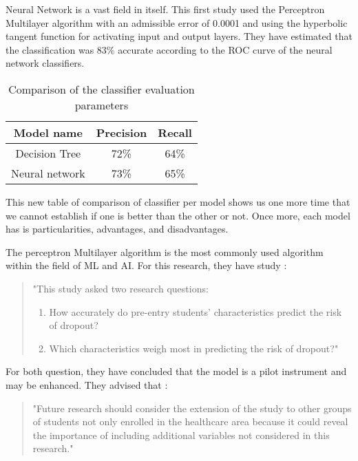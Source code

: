 Neural Network is a vast field in itself. This first study used the Perceptron Multilayer algorithm with an admissible error of 0.0001 and using the hyperbolic tangent function for activating input and output layers\cite{viloria_integration_2019}. They have estimated that the classification was 83\% accurate according to the ROC curve of the neural network classifiers.
\begin{table}[H]
    \centering
    \caption{Comparison of the classifier evaluation parameters\cite{viloria_integration_2019}}
    \begin{tabular}{|c|c|c|}
        \hline
        \textbf{Model name} & \textbf{Precision}  & \textbf{Recall}\\
        \hline
        Decision Tree & 72\% & 64\% \\
        \hline
        Neural network & 73\% & 65\% \\
        \hline
    \end{tabular}
    \label{tab:comparaison_classifier_eval_param_viloria}
\end{table}

This new table of comparison of classifier per model shows us one more time that we cannot establish if one is better than the other or not. Once more, each model has is particularities, advantages, and disadvantages. 

The perceptron Multilayer algorithm is the most commonly used algorithm within the field of ML and AI.\cite{siri_predicting_2015} For this research, they have study :
\begin{quote}
    "This study asked two research questions: 
    \begin{enumerate}
        \item How accurately do pre-entry students’ characteristics predict the risk of dropout?
        \item Which characteristics weigh most in predicting the risk of dropout?"
    \end{enumerate} 
\end{quote}\cite{siri_predicting_2015}
For both question, they have concluded that the model is a pilot instrument and may be enhanced. They advised that :
\begin{quote}
    "Future research should consider the extension of the study to other groups of students not only enrolled in the healthcare area because it could reveal the importance of including additional variables not considered in this research."
\end{quote}\cite{siri_predicting_2015}


